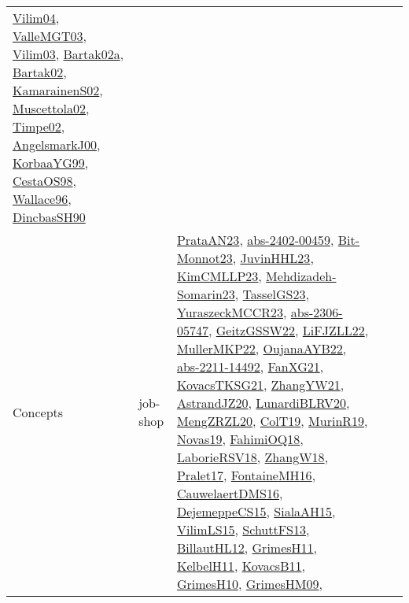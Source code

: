 {\begin{longtable}{lp{3cm}>{\raggedright}p{6cm}>{\raggedright}p{6cm}p{8cm}}
\href{papers/Vilim04.pdf}{Vilim04}\cite{Vilim04}, \href{papers/ValleMGT03.pdf}{ValleMGT03}\cite{ValleMGT03}, \href{papers/Vilim03.pdf}{Vilim03}\cite{Vilim03}, \href{papers/Bartak02a.pdf}{Bartak02a}\cite{Bartak02a}, \href{papers/Bartak02.pdf}{Bartak02}\cite{Bartak02}, \href{papers/KamarainenS02.pdf}{KamarainenS02}\cite{KamarainenS02}, \href{papers/Muscettola02.pdf}{Muscettola02}\cite{Muscettola02}, \href{articles/Timpe02.pdf}{Timpe02}\cite{Timpe02}, \href{papers/AngelsmarkJ00.pdf}{AngelsmarkJ00}\cite{AngelsmarkJ00}, \href{papers/KorbaaYG99.pdf}{KorbaaYG99}\cite{KorbaaYG99}, \href{papers/CestaOS98.pdf}{CestaOS98}\cite{CestaOS98}, \href{articles/Wallace96.pdf}{Wallace96}\cite{Wallace96}, \href{articles/DincbasSH90.pdf}{DincbasSH90}\cite{DincbasSH90}\\
Concepts & job-shop & \href{articles/PrataAN23.pdf}{PrataAN23}\cite{PrataAN23}, \href{articles/abs-2402-00459.pdf}{abs-2402-00459}\cite{abs-2402-00459}, \href{papers/Bit-Monnot23.pdf}{Bit-Monnot23}\cite{Bit-Monnot23}, \href{papers/JuvinHHL23.pdf}{JuvinHHL23}\cite{JuvinHHL23}, \href{papers/KimCMLLP23.pdf}{KimCMLLP23}\cite{KimCMLLP23}, \href{papers/Mehdizadeh-Somarin23.pdf}{Mehdizadeh-Somarin23}\cite{Mehdizadeh-Somarin23}, \href{papers/TasselGS23.pdf}{TasselGS23}\cite{TasselGS23}, \href{articles/YuraszeckMCCR23.pdf}{YuraszeckMCCR23}\cite{YuraszeckMCCR23}, \href{articles/abs-2306-05747.pdf}{abs-2306-05747}\cite{abs-2306-05747}, \href{papers/GeitzGSSW22.pdf}{GeitzGSSW22}\cite{GeitzGSSW22}, \href{papers/LiFJZLL22.pdf}{LiFJZLL22}\cite{LiFJZLL22}, \href{articles/MullerMKP22.pdf}{MullerMKP22}\cite{MullerMKP22}, \href{papers/OujanaAYB22.pdf}{OujanaAYB22}\cite{OujanaAYB22}, \href{articles/abs-2211-14492.pdf}{abs-2211-14492}\cite{abs-2211-14492}, \href{articles/FanXG21.pdf}{FanXG21}\cite{FanXG21}, \href{papers/KovacsTKSG21.pdf}{KovacsTKSG21}\cite{KovacsTKSG21}, \href{articles/ZhangYW21.pdf}{ZhangYW21}\cite{ZhangYW21}, \href{articles/AstrandJZ20.pdf}{AstrandJZ20}\cite{AstrandJZ20}, \href{articles/LunardiBLRV20.pdf}{LunardiBLRV20}\cite{LunardiBLRV20}, \href{articles/MengZRZL20.pdf}{MengZRZL20}\cite{MengZRZL20}, \href{papers/ColT19.pdf}{ColT19}\cite{ColT19}, \href{papers/MurinR19.pdf}{MurinR19}\cite{MurinR19}, \href{articles/Novas19.pdf}{Novas19}\cite{Novas19}, \href{articles/FahimiOQ18.pdf}{FahimiOQ18}\cite{FahimiOQ18}, \href{articles/LaborieRSV18.pdf}{LaborieRSV18}\cite{LaborieRSV18}, \href{articles/ZhangW18.pdf}{ZhangW18}\cite{ZhangW18}, \href{papers/Pralet17.pdf}{Pralet17}\cite{Pralet17}, \href{papers/FontaineMH16.pdf}{FontaineMH16}\cite{FontaineMH16}, \href{papers/CauwelaertDMS16.pdf}{CauwelaertDMS16}\cite{CauwelaertDMS16}, \href{papers/DejemeppeCS15.pdf}{DejemeppeCS15}\cite{DejemeppeCS15}, \href{papers/SialaAH15.pdf}{SialaAH15}\cite{SialaAH15}, \href{papers/VilimLS15.pdf}{VilimLS15}\cite{VilimLS15}, \href{papers/SchuttFS13.pdf}{SchuttFS13}\cite{SchuttFS13}, \href{papers/BillautHL12.pdf}{BillautHL12}\cite{BillautHL12}, \href{papers/GrimesH11.pdf}{GrimesH11}\cite{GrimesH11}, \href{articles/KelbelH11.pdf}{KelbelH11}\cite{KelbelH11}, \href{articles/KovacsB11.pdf}{KovacsB11}\cite{KovacsB11}, \href{papers/GrimesH10.pdf}{GrimesH10}\cite{GrimesH10}, \href{papers/GrimesHM09.pdf}{GrimesHM09}\cite{GrimesHM09}, 
\end{longtable}}
